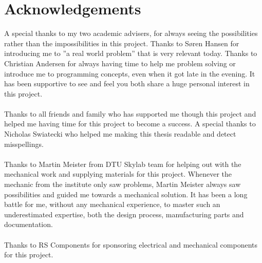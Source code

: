 \chapter{Acknowledgements}
A special thanks to my two academic advisers, for always seeing the possibilities rather than the impossibilities in this project. Thanks to Søren Hansen for introducing me to ''a real world problem'' that is very relevant today. Thanks to Christian Andersen for always having time to help me problem solving or introduce me to programming concepts, even when it got late in the evening. It has been supportive to see and feel you both share a huge personal interest in this project.\\ 
\\
Thanks to all friends and family who has supported me though this project and helped me having time for this project to become a success. A special thanks to Nicholas Swiatecki who helped me making this thesis readable and detect misspellings.\\ 
\\
Thanks to Martin Meister from DTU Skylab team for helping out with the mechanical work and supplying materials for this project. Whenever the mechanic from the institute only saw problems, Martin Meister always saw possibilities and guided me towards a mechanical solution. It has been a long battle for me, without any mechanical experience, to master such an underestimated expertise, both the design process, manufacturing parts and documentation. \\
\\
Thanks to RS Components for sponsoring electrical and mechanical components for this project. 